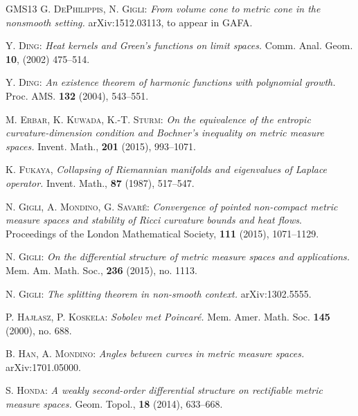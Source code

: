 \documentclass[a4paper,11pt,reqno]{article}
\numberwithin{equation}{section}
\theoremstyle{plain}
\theoremstyle{definition}
\theoremstyle{remark}
\begin{document}
{\begin{thebibliography}{GMS13}
        \textsc{G. DePhilippis, N. Gigli}:
        \textit{From volume cone to metric cone in the nonsmooth setting.}
 arXiv:1512.03113, to appear in GAFA.

         \textsc{Y. Ding}:
         \textit{Heat kernels and Green's functions on limit spaces.}
         Comm. Anal. Geom. \textbf{10}, (2002) 475--514. 

         \textsc{Y. Ding}:
         \textit{An existence theorem of harmonic functions with polynomial growth.}
         Proc. AMS. \textbf{132} (2004), 543--551.

        \textsc{M. Erbar, K. Kuwada, K.-T. Sturm}:
        \textit{On the equivalence of the entropic curvature-dimension condition and Bochner's inequality on metric measure spaces.}
        Invent. Math., \textbf{201} (2015), 993--1071. 
   
        \textsc{K. Fukaya},
        \textit{Collapsing of Riemannian manifolds and eigenvalues of Laplace operator.}
         Invent. Math., \textbf{87} (1987), 517--547.

	\textsc{N. Gigli, A. Mondino, G. Savar\'e}:
	\textit{Convergence of pointed non-compact metric measure spaces and
	stability of Ricci curvature bounds and heat flows}.
	Proceedings of the London Mathematical Society, \textbf{111} (2015), 1071--1129. 

        \textsc{N. Gigli}:
        \textit{On the differential structure of metric measure spaces and applications.}
      Mem. Am. Math. Soc., \textbf{236} (2015), no. 1113.  
	
        \textsc{N. Gigli}:
        \textit{The splitting theorem in non-smooth context.}
      arXiv:1302.5555.

        \textsc{P. Haj\l asz, P.  Koskela}: \textit{Sobolev met Poincar\'e.}
 Mem. Amer. Math. Soc.  {\bf 145}  (2000),  no. 688.

        \textsc{B. Han, A. Mondino}:
        \textit{Angles between curves in metric measure spaces.}
 arXiv:1701.05000.
 
        \textsc{S. Honda}:
        \textit{A weakly second-order differential structure on rectifiable metric measure spaces.}
        Geom. Topol., \textbf{18} (2014), 633--668.
         

\end{thebibliography}}
\end{document}
